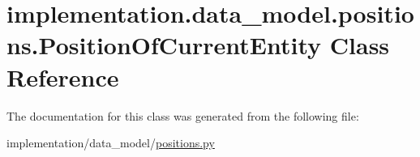 \hypertarget{classimplementation_1_1data__model_1_1positions_1_1_position_of_current_entity}{}\section{implementation.\+data\+\_\+model.\+positions.\+Position\+Of\+Current\+Entity Class Reference}
\label{classimplementation_1_1data__model_1_1positions_1_1_position_of_current_entity}


The documentation for this class was generated from the following file\+:\begin{DoxyCompactItemize}
\item 
implementation/data\+\_\+model/\hyperlink{positions_8py}{positions.\+py}\end{DoxyCompactItemize}
